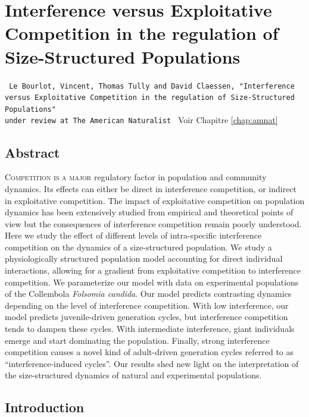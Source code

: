 \chapter{Interference versus
Exploitative Competition in the regulation of Size-Structured Populations}
\label{An:AmNat}

\vspace{2cm}
\begin{Spacing}{1}
\texttt{
Le Bourlot, Vincent, Thomas Tully and David Claessen, "Interference versus
Exploitative Competition in the regulation of Size-Structured Populations"\\
under review at The American Naturalist
}
Voir Chapitre \ref{chap:amnat}
\end{Spacing}


\section*{Abstract}

\lettrine[lines=3]{C}{ompetition is a major} regulatory factor in population
and community dynamics.
Its effects can either be direct in interference competition, or indirect in
exploitative competition. The impact of exploitative competition on population
dynamics has been extensively studied from empirical and theoretical points of
view but the consequences of interference competition remain poorly understood.
Here we study the effect of different levels of intra-specific interference
competition on the dynamics of a size-structured population. We study a
physiologically structured population model accounting for direct individual
interactions, allowing for a gradient from exploitative competition to
interference competition. We parameterize our model with data on experimental
populations of the Collembola \textit{Folsomia candida}. Our model predicts
contrasting dynamics depending on the level of interference competition. With low
interference, our model predicts juvenile-driven generation cycles, but
interference competition tends to dampen these cycles. With intermediate
interference, giant individuals emerge and start dominating the population.
Finally, strong interference competition causes a novel kind of adult-driven
generation cycles referred to as “interference-induced cycles”. Our results shed
new light on the interpretation of the size-structured dynamics of natural and
experimental populations.

\section{Introduction}

